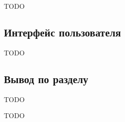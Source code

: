 \documentclass{mirea}
\begin{document}
TODO

\subsection{Интерфейс пользователя}

TODO

\subsection*{Вывод по разделу}

TODO


\begin{comment}
\section{Экономический раздел}
\subsection{Планирование разработки программного продукта}
\subsection{Составление сметы затрат на разработку}
\subsubsection{Материальные затраты}
\subsubsection{Затраты на оплату труда}
\subsubsection{Амортизационные отчисления}
\subsubsection{Прочие расходы}
\end{comment}


TODO



\begin{thebibliography}{99\kern\bibindent}
\end{thebibliography}
\end{document}
